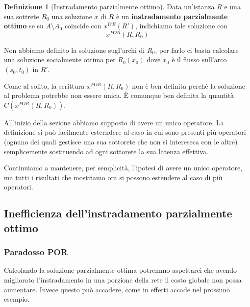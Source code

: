 \documentclass[a4paper]{article}
\newcounter{counter1}
\theoremstyle{plain}
\theoremstyle{definition}
\newtheorem{mydef}[counter1]{Definizione}
\theoremstyle{remark}
\newcommand{\pa}[1]{\left(#1\right)}
\begin{document}
\begin{mydef}[Instradamento parzialmente ottimo]
  Data un'istanza $R$ e una sua sottrete $R_0$ una soluzione $x$ di
  $R$ è un \textbf{instradamento parzialmente ottimo} se su
  $A\setminus A_0$ coincide con $x^{WE}(R')$, indichiamo tale
  soluzione con
  \[ x^{POR}(R,R_0) \]
\end{mydef}

Non abbiamo definito la soluzione sugl'archi di $R_0$, per farlo ci
basta calcolare una soluzione socialmente ottima per $R_0\pa{x_0}$
dove $x_0$ è il flusso sull'arco $\pa{s_0,t_0}$ in $R'$.

Come al solito, la scrittura $x^{POR}\pa{R,R_0}$ non è ben definita
perché la soluzione al problema potrebbe non essere unica. È comunque
ben definita la quantità $C\pa{x^{POR}\pa{R,R_0}}$.

All'inizio della sezione abbiamo supposto di avere un unico operatore.
La definizione si può facilmente esterndere al caso in cui sono
presenti più operatori (ognuno dei quali gestisce una sua sottorete
che non si intereseca con le altre) semplicemente sostituendo ad ogni
sottorete la sua latenza effettiva.

Continuiamo a mantenere, per semplicità, l'ipotesi di avere un unico
operatore, ma tutti i risultati che mostriamo ora si possono estendere
al caso di più operatori.

\subsection{Inefficienza dell'instradamento parzialmente ottimo}
\label{sec:inefficienza-por}

\subsubsection{Paradosso POR}
\label{sec:paradosso-por}

Calcolando la soluzione parzialmente ottima potremmo aspettarci che
avendo migliorato l'instradamento in una porzione della rete il costo
globale non possa aumentare. Invece questo può accadere, come in
effetti accade nel prossimo esempio.
\end{document}
